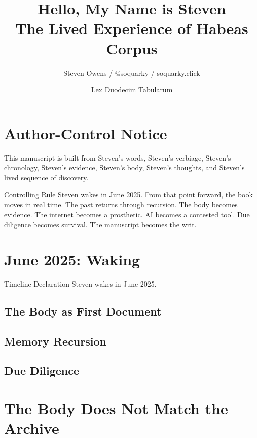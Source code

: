 \documentclass[12pt,openany]{book}
\title{Hello, My Name is Steven\\\large The Lived Experience of Habeas Corpus}
\author{Steven Owens / @soquarky / soquarky.click}
\date{Lex Duodecim Tabularum}
\begin{document}
\frontmatter
\maketitle


\chapter*{Author-Control Notice}
This manuscript is built from Steven's words, Steven's verbiage, Steven's chronology, Steven's evidence, Steven's body, Steven's thoughts, and Steven's lived sequence of discovery.

\begin{writbox}{Controlling Rule}
Steven wakes in June 2025. From that point forward, the book moves in real time. The past returns through recursion. The body becomes evidence. The internet becomes a prosthetic. AI becomes a contested tool. Due diligence becomes survival. The manuscript becomes the writ.
\end{writbox}

\mainmatter

\chapter{June 2025: Waking}

\begin{evidencebox}{Timeline Declaration}
Steven wakes in June 2025.
\end{evidencebox}

\section{The Body as First Document}
\unknown

\section{Memory Recursion}
\unknown

\section{Due Diligence}
\unknown

\chapter{The Body Does Not Match the Archive}
\end{document}
